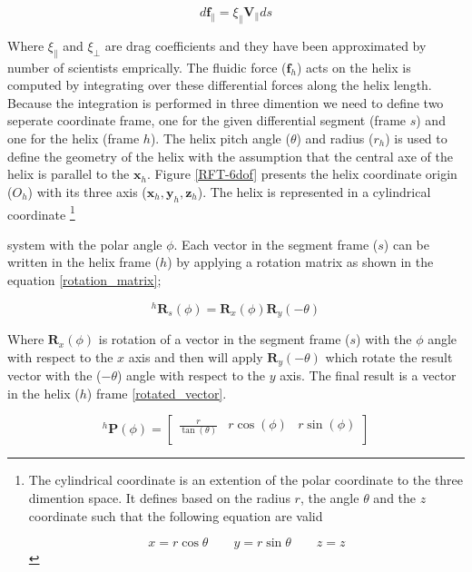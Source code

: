 \documentclass[12pt,a4paper,titlepage]{report}
\begin{document}
\begin{equation}
 d{\bm{f}_{\parallel}} = {\xi}_{\parallel}{\bm{V}_{\parallel}}ds
\label{relation-force_drag}
\end{equation}

Where ${\xi}_{\parallel}$ and ${\xi}_{\perp}$ are drag coefficients and they have been approximated by number
of scientists emprically. The fluidic force ($ \bm{f}_h$) acts on the helix is computed by integrating over these 
differential forces along the helix length. Because the integration is performed in three dimention
 we need to define two seperate coordinate frame, one for the given
differential segment (frame $s$) and one for the helix (frame $h$). The helix pitch angle ($\theta$) 
and radius ($r_h$) is used to define the geometry of the helix with the assumption that the central
 axe of the helix is
parallel to the $\bm{x}_h$. Figure \ref{RFT-6dof} presents the helix coordinate origin ($O_h$) with 
its three axis ($\bm{x}_h , \bm{y}_h , \bm{z}_h$). The helix is represented in a cylindrical coordinate
\footnote{The cylindrical coordinate is an extention of the polar coordinate to the three dimention space. It
defines based on the radius $r$, the angle $\theta$ and the $z$ coordinate such that the following equation
are valid

\begin{equation}
 x = r\cos{\theta} \qquad  y = r\sin{\theta}  \qquad  z = z
\label{cylindrical_coordinate}
\end{equation}
}

system with the polar angle $\phi$. Each vector in the segment frame ($s$) can be written in the helix
frame ($h$) by applying a rotation matrix as shown in the equation \ref{rotation_matrix};
  

\begin{equation}
 ^{h}\bm{R}_s(\phi) = \bm{R}_x(\phi)\bm{R}_y(-\theta)
\label{rotation_matrix}
\end{equation}

Where $\bm{R}_x(\phi)$ is rotation of a vector in the segment frame ($s$) with the $\phi$ angle with
respect to the $x$
axis and then will apply $\bm{R}_y(-\theta)$ which rotate the result vector with the ($-\theta$) angle with
respect to the $y$ axis. The final result is a vector in the helix ($h$) frame \ref{rotated_vector}.



\begin{equation}
 ^{h}\bm{P}(\phi) = \begin{bmatrix}
       \frac{r}{\tan(\theta)} & r\cos(\phi) & r\sin(\phi)    \\[0.3em]
       
     			   \end{bmatrix}
\label{rotated_vector}
\end{equation}
\end{document}
